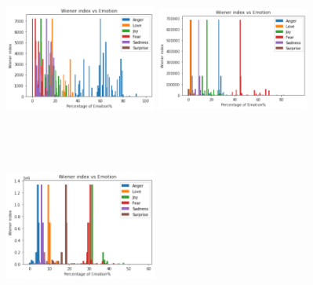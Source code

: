 \begin{figure}[h]
  \begin{minipage}{.33\textwidth}
    \centering
    \includegraphics[width=5cm,height=5.5cm,keepaspectratio]{plots/weiner_anger.pdf}
  \end{minipage}%
  \begin{minipage}{.33\textwidth}
    \centering
    \includegraphics[width=5cm,height=5.5cm,keepaspectratio]{plots/weiner_fear.pdf}
  \end{minipage}%
  \begin{minipage}{.33\textwidth}
    \centering
    \includegraphics[width=5cm,height=5.5cm,keepaspectratio]{plots/weiner_joy.pdf}
  \end{minipage}
 \medskip
  \begin{minipage}{.5\textwidth}

\end{minipage}
\end{figure}
